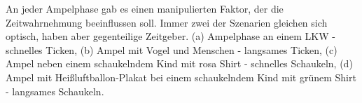 \documentclass{Paper}
\begin{document}
An jeder Ampelphase gab es einen manipulierten Faktor, der die
Zeitwahrnehmung beeinflussen soll. Immer zwei der Szenarien gleichen sich optisch, haben aber gegenteilige Zeitgeber. (a) Ampelphase an einem LKW - schnelles Ticken, (b) Ampel mit Vogel und
Menschen - langsames Ticken, (c) Ampel neben einem schaukelndem Kind mit rosa Shirt -
schnelles Schaukeln, (d) Ampel mit Heißluftballon-Plakat bei einem schaukelndem Kind mit
grünem Shirt - langsames Schaukeln.

\begin{figure}[H]
\end{figure}

\begin{figure}[H]
\end{figure}
\end{document}
